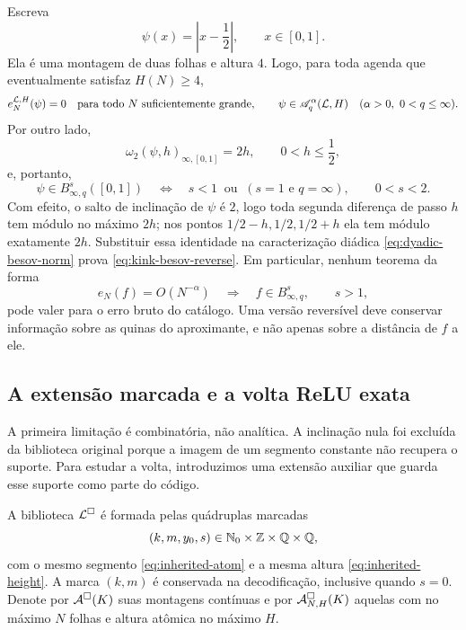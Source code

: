 Escreva
\begin{equation}
 \psi(x)=\left|x-\frac12\right|,
 \qquad x\in[0,1].
 \label{eq:reverse-kink}
\end{equation}
Ela é uma montagem de duas folhas e altura $4$. Logo, para toda agenda que
eventualmente satisfaz $H(N)\ge4$,
\begin{equation}
 e_N^{\mathcal{L},H}(\psi)=0
 \quad\text{para todo $N$ suficientemente grande},
 \qquad
 \psi\in\mathscr A_q^\alpha(\mathcal{L},H)
 \quad(\alpha>0,\ 0<q\le\infty).
 \label{eq:kink-zero-raw-error}
\end{equation}
Por outro lado,
\begin{equation}
 \omega_2(\psi,h)_{\infty,[0,1]}=2h,
 \qquad 0<h\le\frac12,
 \label{eq:kink-exact-modulus-reverse}
\end{equation}
e, portanto,
\begin{equation}
 \psi\in B^s_{\infty,q}([0,1])
 \quad\Longleftrightarrow\quad
 s<1\ \text{ ou }\ (s=1\text{ e }q=\infty),
 \qquad 0<s<2.
 \label{eq:kink-besov-reverse}
\end{equation}
Com efeito, o salto de inclinação de $\psi$ é $2$, logo toda segunda diferença
de passo $h$ tem módulo no máximo $2h$; nos pontos
$1/2-h,1/2,1/2+h$ ela tem módulo exatamente $2h$. Substituir essa identidade
na caracterização diádica \eqref{eq:dyadic-besov-norm} prova
\eqref{eq:kink-besov-reverse}. Em particular, nenhum
teorema da forma
\begin{equation}
 e_N(f)=O(N^{-\alpha})\quad\Longrightarrow\quad
 f\in B^s_{\infty,q},
 \qquad s>1,
 \label{eq:forbidden-unregularized-converse}
\end{equation}
pode valer para o erro bruto do catálogo. Uma versão reversível deve conservar
informação sobre as quinas do aproximante, e não apenas sobre a distância de
$f$ a ele.

\subsection{A extensão marcada e a volta ReLU exata}

A primeira limitação é combinatória, não analítica. A inclinação nula foi
excluída da biblioteca original porque a imagem de um segmento constante não
recupera o suporte. Para estudar a volta, introduzimos uma extensão auxiliar
que guarda esse suporte como parte do código.

\begin{definition}
\label{def:marked-completion}
A biblioteca $\mathcal{L}^\square$ é formada pelas quádruplas marcadas
\begin{equation}
 (k,m,y_0,s)\in\mathbb{N}_0\times\mathbb Z\times\mathbb Q\times\mathbb Q,
 \label{eq:marked-atoms}
\end{equation}
com o mesmo segmento \eqref{eq:inherited-atom} e a mesma altura
\eqref{eq:inherited-height}. A marca $(k,m)$ é conservada na decodificação,
inclusive quando $s=0$. Denote por $\mathcal{A}^\square(K)$ suas montagens
contínuas e por $\mathcal{A}^\square_{N,H}(K)$ aquelas com no máximo $N$
folhas e altura atômica no máximo $H$.
\end{definition}

